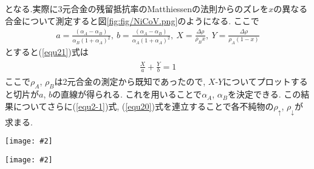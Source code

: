 \documentclass[uplatex,a4j,11pt,dvipdfmx]{jsarticle}
\makeatletter
\def\fgcaption{\def\@captype{figure}\caption}
\newcommand{\mfig}[3][width=15cm]{
\begin{center}
\texttt{[image: \#2]}
\fgcaption{#3 \label{fig:#2}}
\end{center}
}
\makeatother
\begin{document}
となる.実際に3元合金の残留抵抗率のMatthiessenの法則からのズレを$x$の異なる合金について測定すると図\ref{fig:fig/NiCoV.png}のようになる.
ここで
\begin{align}
  a=\frac{(\alpha_A-\alpha_B)}{\alpha_B(1+\alpha_A)^2},\ b=\frac{(\alpha_A-\alpha_B)}{\alpha_A(1+\alpha_A)^2},\ X=\frac{\Delta\rho}{\rho_Bx},\ Y=\frac{\Delta\rho}{\rho_A(1-x)}
\end{align}
とすると(\ref{equ21})式は
\begin{align}
  \begin{split}
    \frac{X}{a}+\frac{Y}{b}=1
  \end{split}
\end{align}
ここで$\rho_A$, $\rho_B$は2元合金の測定から既知であったので,
$X$-$Y$についてプロットすると切片が$a$, $b$の直線が得られる.
これを用いることで$\alpha_A$, $\alpha_B$を決定できる.
この結果についてさらに(\ref{equ2-1})式, (\ref{equ20})式を連立することで各不純物の$\rho_\uparrow$, $\rho_\downarrow$が求まる.\cite{kiso}\cite{fert_electrical_1976}
\mfig[width=8cm]{fig/2cm_3.png}{2流体モデルでの3元素合金の抵抗率の計算}
\mfig[width=8cm]{fig/NiCoV.png}{${\rm NiCo}_{1-x}{\rm V}_x$合金の残留抵抗率のMatthiessenの法則からのズレ\cite{fert_electrical_1976}}
\clearpage
\end{document}
